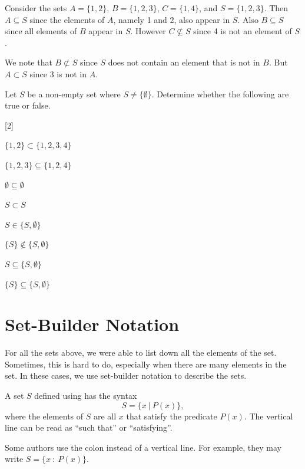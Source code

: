 \begin{example}
    Consider the sets $A = \{1, 2\}$, $B = \{1, 2, 3\}$, $C = \{1, 4\}$, and $S = \{1, 2, 3\}$. Then $A \subseteq S$ since the elements of $A$, namely 1 and 2, also appear in $S$. Also $B \subseteq S$ since all elements of $B$ appear in $S$. However $C \not\subseteq S$ since 4 is not an element of $S$.

    We note that $B \not\subset S$ since $S$ does not contain an element that is not in $B$. But $A \subset S$ since 3 is not in $A$.
\end{example}

\begin{exercise}
    Let $S$ be a non-empty set where $S \neq \{\emptyset\}$. Determine whether the following are true or false.
    \begin{partquestions}{\alph*}[2]
        \item $\{1, 2\} \subset \{1, 2, 3, 4\}$
        \item $\{1, 2, 3\} \subseteq \{1, 2, 4\}$
        \item $\emptyset \subseteq \emptyset$
        \item $S \subset S$
        \item $S \in \{S, \emptyset\}$
        \item $\{S\} \notin \{S, \emptyset\}$
        \item $S \subseteq \{S, \emptyset\}$
        \item $\{S\} \subseteq \{S, \emptyset\}$
    \end{partquestions}
\end{exercise}

\section{Set-Builder Notation}
For all the sets above, we were able to list down all the elements of the set. Sometimes, this is hard to do, especially when there are many elements in the set. In these cases, we use set-builder notation to describe the sets.

\begin{definition}
    A set $S$ defined using  has the syntax
    \[
        S = \{x \ | \ P(x)\},
    \]
    where the elements of $S$ are all $x$ that satisfy the predicate $P(x)$. The vertical line can be read as ``such that'' or ``satisfying''.
\end{definition}
\begin{remark}
    Some authors use the colon instead of a vertical line. For example, they may write $S = \{x \ : \ P(x)\}$.
\end{remark}

